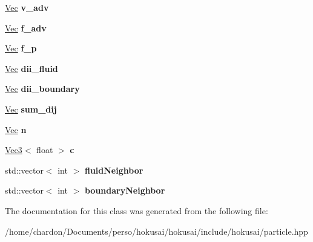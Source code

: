\begin{DoxyCompactItemize}
\item 
\hypertarget{classhokusai_1_1Particle_a7b2cddcaaf225ef16231752814cd4f8b}{\hyperlink{classhokusai_1_1Vec3}{Vec} {\bfseries v\+\_\+adv}}\label{classhokusai_1_1Particle_a7b2cddcaaf225ef16231752814cd4f8b}

\item 
\hypertarget{classhokusai_1_1Particle_a716bdba9e05b12eeaad9d081bf3c0ae2}{\hyperlink{classhokusai_1_1Vec3}{Vec} {\bfseries f\+\_\+adv}}\label{classhokusai_1_1Particle_a716bdba9e05b12eeaad9d081bf3c0ae2}

\item 
\hypertarget{classhokusai_1_1Particle_aafeb4e252a59b932e116e1a0d3610e53}{\hyperlink{classhokusai_1_1Vec3}{Vec} {\bfseries f\+\_\+p}}\label{classhokusai_1_1Particle_aafeb4e252a59b932e116e1a0d3610e53}

\item 
\hypertarget{classhokusai_1_1Particle_aa6dcccf45fdd1669f7cf5851497aaa08}{\hyperlink{classhokusai_1_1Vec3}{Vec} {\bfseries dii\+\_\+fluid}}\label{classhokusai_1_1Particle_aa6dcccf45fdd1669f7cf5851497aaa08}

\item 
\hypertarget{classhokusai_1_1Particle_a8f37dc0eb1f3550ab0c1f6cbd0d54697}{\hyperlink{classhokusai_1_1Vec3}{Vec} {\bfseries dii\+\_\+boundary}}\label{classhokusai_1_1Particle_a8f37dc0eb1f3550ab0c1f6cbd0d54697}

\item 
\hypertarget{classhokusai_1_1Particle_a552a5baa9039512b0f17146169496775}{\hyperlink{classhokusai_1_1Vec3}{Vec} {\bfseries sum\+\_\+dij}}\label{classhokusai_1_1Particle_a552a5baa9039512b0f17146169496775}

\item 
\hypertarget{classhokusai_1_1Particle_aff3cb5308688e6fdb2a606d4bb87501b}{\hyperlink{classhokusai_1_1Vec3}{Vec} {\bfseries n}}\label{classhokusai_1_1Particle_aff3cb5308688e6fdb2a606d4bb87501b}

\item 
\hypertarget{classhokusai_1_1Particle_aecb32163a6367156b0c2051d1108f01e}{\hyperlink{classhokusai_1_1Vec3}{Vec3}$<$ float $>$ {\bfseries c}}\label{classhokusai_1_1Particle_aecb32163a6367156b0c2051d1108f01e}

\item 
\hypertarget{classhokusai_1_1Particle_a76ddab34d1fa3bf373ecdd7201e2885e}{std\+::vector$<$ int $>$ {\bfseries fluid\+Neighbor}}\label{classhokusai_1_1Particle_a76ddab34d1fa3bf373ecdd7201e2885e}

\item 
\hypertarget{classhokusai_1_1Particle_a2432250524518434750c819fbe9e0064}{std\+::vector$<$ int $>$ {\bfseries boundary\+Neighbor}}\label{classhokusai_1_1Particle_a2432250524518434750c819fbe9e0064}

\end{DoxyCompactItemize}


The documentation for this class was generated from the following file\+:\begin{DoxyCompactItemize}
\item 
/home/chardon/\+Documents/perso/hokusai/hokusai/include/hokusai/particle.\+hpp\end{DoxyCompactItemize}
